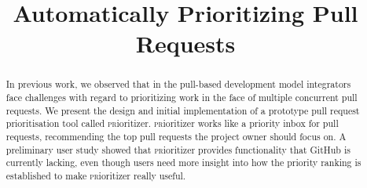 \documentclass[conference]{IEEEtran}
\begin{document}
\newcommand{\ghtorrent}{\textsc{ght}orrent\xspace}
\newcommand{\prioritizer}{\textsc{pr}ioritizer\xspace}
\newcommand{\api}{\textsc{api}\xspace}
\newcommand{\todo}[1]{\textcolor{red}{\textbf{\textsc{todo:}} #1}}

\newcommand{\nb}[3]{
  \fcolorbox{black}{#2}{\bfseries\sffamily\scriptsize#1}
    {\sf\small$\blacktriangleright$\textit{#3}$\blacktriangleleft$}
}

\newcommand\georgios[1]{\nb{Georgios}{yellow}{#1}}
\newcommand\andy[1]{\nb{Andy}{cyan}{#1}}
\newcommand\erik[1]{\nb{Erik}{magenta}{#1}}

\newcommand{\hassanbox}[1]
{
  \vspace{0.29em}
  \noindent
  \fbox{
  \begin{minipage}{0.46\textwidth}
    \emph{\noindent #1}
    \end{minipage}
}}

\newcommand{\resp}[2]{{\sc R#1:} ``\emph{#2}''}
\newcommand{\respnum}[1]{{\sc R#1}}
\newcommand{\code}[1]{{\textsl{#1}}}

\title{Automatically Prioritizing Pull Requests}


\author{
\and
{}
\and
{}
}

\maketitle

\begin{abstract}

In previous work, we observed that in the pull-based development model integrators face challenges with regard to prioritizing work in the face of multiple concurrent pull requests. We present the design and initial implementation of a prototype pull request prioritisation tool called \prioritizer. \prioritizer works like a priority inbox for pull requests, recommending the top pull requests the project owner should focus on. A preliminary user study showed that \prioritizer provides functionality that GitHub is currently lacking, even though users need more insight into how the priority ranking is established to make \prioritizer really useful.

\end{abstract}
\end{document}
